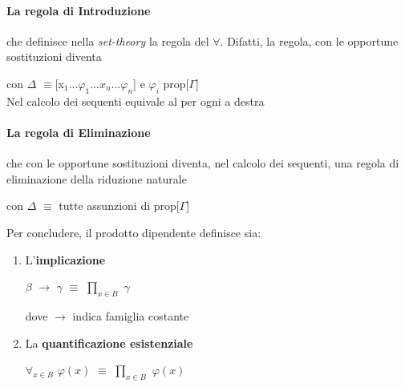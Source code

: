 \paragraph{La regola di Introduzione}
\begin{prooftree}
\end{prooftree}
\noindent
che definisce nella \textit{set-theory} la regola del $\forall$. Difatti, la regola, con le opportune sostituzioni diventa
\begin{prooftree}
\end{prooftree}
\noindent
con $\Delta$ $\equiv$[x$_1$...$\varphi_1$...$x_n$...$\varphi_n$] e $\varphi_i$ prop[$\Gamma$]\\
Nel calcolo dei sequenti equivale al per ogni a destra
\begin{prooftree}
\end{prooftree}
\noindent 
\paragraph{La regola di Eliminazione}
\begin{prooftree}
\end{prooftree}
\noindent
che con le opportune sostituzioni diventa, nel calcolo dei sequenti, una regola di eliminazione della riduzione naturale
\begin{prooftree}
\end{prooftree}
con $\Delta$ $\equiv$ tutte assunzioni di prop[$\Gamma$]
\noindent

\vspace{0.5cm}
\noindent
Per concludere, il prodotto dipendente definisce sia:
\begin{enumerate}
\item L'\textbf{implicazione}
\begin{center} $\beta$ $\rightarrow$ $\gamma$ $\equiv$ $\prod\limits_{x \in B}$ $\gamma$ \end{center}
dove $\rightarrow$ indica famiglia costante
\item La \textbf{quantificazione esistenziale}
\begin{center}$\forall_{x \in B}$ $\varphi(x)$ $\equiv$ $\prod\limits_{x \in B}$ $\varphi(x)$ \end{center}
\end{enumerate}


